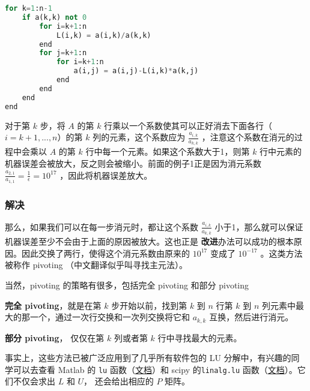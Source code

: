 \begin{lstlisting}[language=python]
for k=1:n-1
    if a(k,k) not 0
        for i=k+1:n
            L(i,k) = a(i,k)/a(k,k)
        end
        for j=k+1:n
            for i=k+1:n
                a(i,j) = a(i,j)-L(i,k)*a(k,j)
            end
        end
    end
end
\end{lstlisting}

对于第  $k$  步，将 $A$  的第  $k$  行乘以一个系数使其可以正好消去下面各行（$i=k+1,...,n$）的第 $k$ 列的元素，这个系数应为  $\frac{a_{i,k}}{a_{k,k}}$  ，注意这个系数在消元的过程中会乘以  $A$  的第  $k $  行中每一个元素。如果这个系数大于1，则第  $k $  行中元素的机器误差会被放大，反之则会被缩小。前面的例子1正是因为消元系数  $\frac{a_{2,1}}{a_{1,1}}=\frac{1}{\epsilon}=10^{17}$  ，因此将机器误差放大。

\subsubsection{解决}

那么，如果我们可以在每一步消元时，都让这个系数  $\frac{a_{i,k}}{a_{k,k}}$ 小于1，那么就可以保证机器误差至少不会由于上面的原因被放大。这也正是	\textbf{改进}办法可以成功的根本原因。因此交换了两行，使得这个消元系数由原来的  $10^{17}$  变成了  $10^{-17}$  。这类方法被称作 pivoting （中文翻译似乎叫寻找主元法）。

当然，pivoting 的策略有很多，包括完全 pivoting 和部分 pivoting

\textbf{完全 pivoting}，就是在第  $k$ 步开始以前，找到第  $k$  到  $n$  行第  $k$  到  $n$  列元素中最大的那一个，通过一次行交换和一次列交换将它和  $a_{k,k}$  互换，然后进行消元。

\textbf{部分 pivoting}， 仅仅在第 $k$ 列或者第 $k$ 行中寻找最大的元素。

事实上，这些方法已被广泛应用到了几乎所有软件包的 LU 分解中，有兴趣的同学可以去查看 Matlab 的 \verb|lu| 函数（\href{https://ww2.mathworks.cn/help/matlab/ref/lu.html}{文档}）和 scipy 的\verb|linalg.lu| 函数（\href{https://docs.scipy.org/doc/scipy/reference/generated/scipy.linalg.lu.html}{文档}）。它们不仅会求出 $L$ 和 $U$， 还会给出相应的 $P$ 矩阵。
